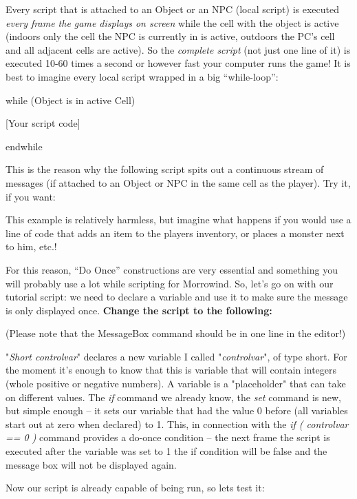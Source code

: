 \documentclass[
]{article}
\begin{document}
Every script that is attached to an Object or an NPC (local script) is
executed \emph{every frame the game displays on screen} while the cell
with the object is active (indoors only the cell the NPC is currently in
is active, outdoors the PC's cell and all adjacent cells are active). So
the \emph{complete script} (not just one line of it) is executed 10-60
times a second or however fast your computer runs the game! It is best
to imagine every local script wrapped in a big ``while-loop'':

while (Object is in active Cell)

{[}Your script code{]}

endwhile

This is the reason why the following script spits out a continuous
stream of messages (if attached to an Object or NPC in the same cell as
the player). Try it, if you want:



This example is relatively harmless, but imagine what happens if you
would use a line of code that adds an item to the players inventory, or
places a monster next to him, etc.!

For this reason, ``Do Once'' constructions are very essential and
something you will probably use a lot while scripting for Morrowind. So,
let's go on with our tutorial script: we need to declare a variable and
use it to make sure the message is only displayed once. \textbf{Change
the script to the following:}



(Please note that the MessageBox command should be in one line in the
editor!)

"\emph{Short controlvar}" declares a new variable I called
"\emph{controlvar}", of type short. For the moment it's enough to know
that this is variable that will contain integers (whole positive or
negative numbers). A variable is a "placeholder" that can take on
different values. The \emph{if} command we already know, the \emph{set}
command is new, but simple enough -- it sets our variable that had the
value 0 before (all variables start out at zero when declared) to 1.
This, in connection with the \emph{if ( controlvar == 0 )} command
provides a do-once condition -- the next frame the script is executed
after the variable was set to 1 the if condition will be false and the
message box will not be displayed again.

Now our script is already capable of being run, so lets test it:
\end{document}
